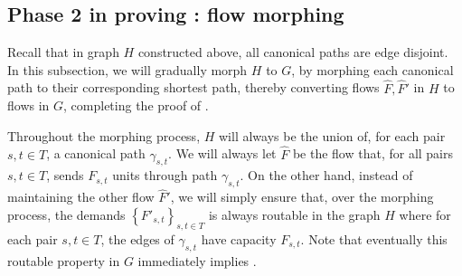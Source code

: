 \documentclass[11pt]{article}
\newcommand{\zihan}[1]{{\color{blue} Zihan: #1}}
\newcommand{\set}[1]{\left\{ #1 \right\}}
\begin{document}
\subsection{Phase 2 in proving : flow morphing}





Recall that in graph $H$ constructed above, all canonical paths are edge disjoint. 
In this subsection, we will gradually morph $H$ to $G$, by morphing each canonical path to their corresponding shortest path, thereby converting flows $\hat F, \hat F'$ in $H$ to flows in $G$, completing the proof of .

Throughout the morphing process, $H$ will always be the union of, for each pair $s,t\in T$, a canonical path $\gamma_{s,t}$. We will always let $\hat F$ be the flow that,  for all pairs $s,t\in T$,  sends $F_{s,t}$ units through path $\gamma_{s,t}$. On the other hand, instead of maintaining the other flow $\hat F'$, we will simply ensure that, over the morphing process, the demands $\set{F'_{s,t}}_{s,t\in T}$ is always routable in the graph $H$ where for each pair $s,t\in T$, the edges of $\gamma_{s,t}$ have capacity $F_{s,t}$. Note that eventually this routable property in $G$ immediately implies .



\end{document}
